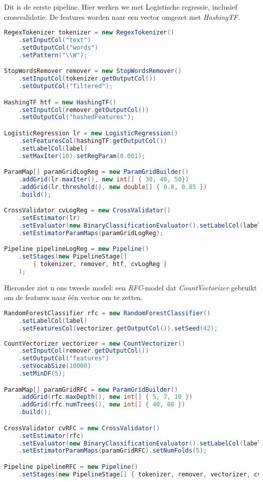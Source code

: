 \documentclass[a4paper,10pt,twoside]{report}
\begin{document}
\newpage

Dit is de eerste pipeline. Hier werken we met Logistische regressie, inclusief crossvalidatie. De features worden naar een vector omgezet met \textit{HashingTF}.

\begin{lstlisting}[language=Java]
RegexTokenizer tokenizer = new RegexTokenizer()
	.setInputCol("text")
	.setOutputCol("words")
	.setPattern("\\W");

StopWordsRemover remover = new StopWordsRemover()
	.setInputCol(tokenizer.getOutputCol())
	.setOutputCol("filtered");

HashingTF htf = new HashingTF()
	.setInputCol(remover.getOutputCol())
	.setOutputCol("hashedFeatures");

LogisticRegression lr = new LogisticRegression()
	.setFeaturesCol(hashingTF.getOutputCol())
	.setLabelCol(label)
	.setMaxIter(10).setRegParam(0.001);

ParamMap[] paramGridLogReg = new ParamGridBuilder()
	.addGrid(lr.maxIter(), new int[] { 30, 40, 50})
	.addGrid(lr.threshold(), new double[] { 0.8, 0.85 })
	.build();

CrossValidator cvLogReg = new CrossValidator()
	.setEstimator(lr)
	.setEvaluator(new BinaryClassificationEvaluator().setLabelCol(label))
	.setEstimatorParamMaps(paramGridLogReg);

Pipeline pipelineLogReg = new Pipeline()
	.setStages(new PipelineStage[] 
		{ tokenizer, remover, htf, cvLogReg }
	);
\end{lstlisting}

Hieronder ziet u ons tweede model: een \textit{RFC}-model dat \textit{CountVectorizer} gebruikt om de features naar één vector om te zetten.

\begin{lstlisting}[language=Java]
RandomForestClassifier rfc = new RandomForestClassifier()
	.setLabelCol(label)
	.setFeaturesCol(vectorizer.getOutputCol()).setSeed(42);
	
CountVectorizer vectorizer = new CountVectorizer()
	.setInputCol(remover.getOutputCol())
	.setOutputCol("features")
	.setVocabSize(10000)
	.setMinDF(5);

ParamMap[] paramGridRFC = new ParamGridBuilder()
	.addGrid(rfc.maxDepth(), new int[] { 5, 7, 10 })
	.addGrid(rfc.numTrees(), new int[] { 40, 80 })
	.build();

CrossValidator cvRFC = new CrossValidator()
	.setEstimator(rfc)
	.setEvaluator(new BinaryClassificationEvaluator().setLabelCol(label))
	.setEstimatorParamMaps(paramGridRFC).setNumFolds(5);

Pipeline pipelineRFC = new Pipeline()
	.setStages(new PipelineStage[] { tokenizer, remover, vectorizer, cvRFC});
\end{lstlisting}
\end{document}
